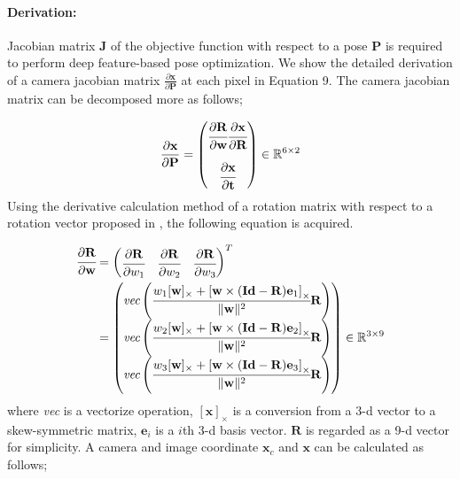 \documentclass[10pt,twocolumn,letterpaper]{article}
\begin{document}
\paragraph{Derivation:}
Jacobian matrix $\mathbf{J}$ of the objective function with respect to a pose $\mathbf{P}$ is required to perform deep feature-based pose optimization.
We show the detailed derivation of a camera jacobian matrix $\frac{\partial \mathbf{x}}{\partial \mathbf{P}}$ at each pixel in Equation 9.
The camera jacobian matrix can be decomposed more as follows;

\begin{equation}
  \frac{\partial \mathbf{x}}{\partial \mathbf{P}} = \begin{pmatrix}
    \cfrac{\partial \mathbf{R}}{\partial \mathbf{w}}
      \cfrac{\partial \mathbf{x}}{\partial \mathbf{R}}\\[3ex]
      \cfrac{\partial \mathbf{x}}{\partial \mathbf{t}}
    \end{pmatrix} \in \mathbb{R}^{6 \times 2}
\end{equation}
Using the derivative calculation method of a rotation matrix with respect to a rotation vector proposed in \cite{compact_rotation_derivative}, the following equation is acquired.

\begin{equation}
\begin{split}
   \cfrac{\partial \mathbf{R}}{\partial \mathbf{w}} &=
     \begin{pmatrix}
       \cfrac{\partial \mathbf{R}}{\partial {w}_1} &
       \cfrac{\partial \mathbf{R}}{\partial {w}_2} &
       \cfrac{\partial \mathbf{R}}{\partial {w}_3} \\
     \end{pmatrix}^{T} \\
     &=
     \begin{pmatrix}
       \textit{vec} \left( \cfrac{w_{1}[\mathbf{w}]_{\times}+\left[\mathbf{w} \times(\mathbf{Id}-\mathbf{R}) \mathbf{e}_{1}\right]_{\times}}{\|\mathbf{w}\|^{2}}\mathbf{R} \right) \\
       \textit{vec} \left( \cfrac{w_{2}[\mathbf{w}]_{\times}+\left[\mathbf{w} \times(\mathbf{Id}-\mathbf{R}) \mathbf{e}_{2}\right]_{\times}}{\|\mathbf{w}\|^{2}}\mathbf{R} \right) \\
       \textit{vec} \left( \cfrac{w_{3}[\mathbf{w}]_{\times}+\left[\mathbf{w} \times(\mathbf{Id}-\mathbf{R}) \mathbf{e}_{3}\right]_{\times}}{\|\mathbf{w}\|^{2}}\mathbf{R} \right) \\
     \end{pmatrix} \in \mathbb{R}^{3 \times 9}
\end{split}
\end{equation}
where \textit{vec} is a vectorize operation, $[\mathbf{x}]_{\times}$ is a conversion from a 3-d vector to a skew-symmetric matrix, $\mathbf{e}_{i}$ is a $i$th 3-d basis vector.
$\mathbf{R}$ is regarded as a 9-d vector for simplicity.
A camera and image coordinate $\mathbf{x}_c$ and $\mathbf{x}$ can be calculated as follows;
\end{document}
